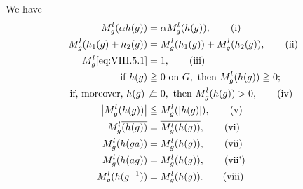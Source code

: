 \begin{theorem}\label{thm:VIII.5.Theorem.2} We have 
\begin{align}
M _{g} ^{l} (\alpha h (g))& = \alpha M _{g} ^{l} (h (g)), \tag{i}\label{eq:VIII.5.i} \\
M _{g} ^{l} (h _{1} (g) + h _{2} (g))& = M _{g} ^{l} (h _{1} (g)) + M _{g} ^{l} (h _{2} (g)), \tag{ii}\label{eq:VIII.5.ii} \\
M _{g} ^{l} \eqref{eq:VIII.5.1}& = 1, \tag{iii}\label{eq:VIII.5.iii} \\
\text{ if } h (g)& \geqq 0 \text{ on } G, \text{ then } M _{g} ^{l} (h (g)) \geqq 0; \notag \\
\text{ if, moreover, } h (g) \not& \equiv 0, \text{ then } M _{g} ^{l} (h (g)) > 0, \tag{iv}\label{eq:VIII.5.iv} \\
\left| M _{g} ^{l} (h (g)) \right|& \leqq M _{g} ^{l} (\left| h (g) \right|), \tag{v}\label{eq:VIII.5.v} \\
M _{g} ^{l} \overline {{(h (g))}}& = \overline {{M _{g} ^{l} (h (g))}}, \tag{vi}\label{eq:VIII.5.vi} \\
M _{g} ^{l} (h (g a))& = M _{g} ^{l} (h (g)), \tag{vii}\label{eq:VIII.5.vii} \\
M _{g} ^{l} (h (a g))& = M _{g} ^{l} (h (g)), \tag{vii'}\label{eq:VIII.5.vii'} \\
M _{g} ^{l} (h (g ^{-1}))& = M _{g} ^{l} (h (g)). \tag{viii}\label{eq:VIII.5.viii}
\end{align}
\end{theorem}

